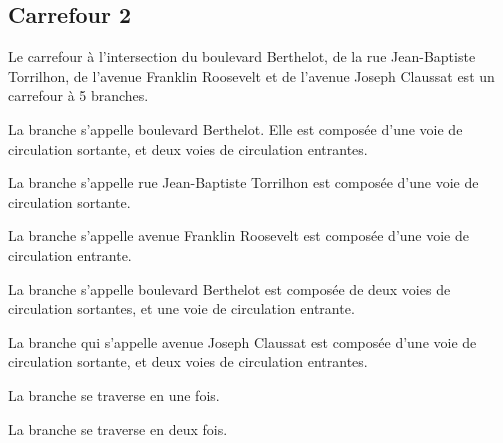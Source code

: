 \begin{appendix}
\subsection*{Carrefour 2}

\label{annexe:q_ID52_carrefour2}

Le carrefour à l'intersection du boulevard Berthelot, de la rue Jean-Baptiste Torrilhon, de l'avenue Franklin Roosevelt et de l'avenue Joseph Claussat est un carrefour à 5 branches.


\newpar{}

La branche  s'appelle boulevard Berthelot. Elle est composée d'une voie de circulation sortante, et deux voies de circulation entrantes.

\newpar{}

La branche  s'appelle rue Jean-Baptiste Torrilhon est composée d'une voie de circulation sortante.

\newpar{}

La branche  s'appelle avenue Franklin Roosevelt est composée d'une voie de circulation entrante.

\newpar{}

La branche  s'appelle boulevard Berthelot est composée de deux voies de circulation sortantes, et une voie de circulation entrante.

\newpar{}

La branche  qui s'appelle avenue Joseph Claussat est composée d'une voie de circulation sortante, et deux voies de circulation entrantes.

\newpar{}


\newpar{}

La branche  se traverse en une fois.  

\newpar{}

 

\newpar{}

La branche  se traverse en deux fois. 


\end{appendix}
